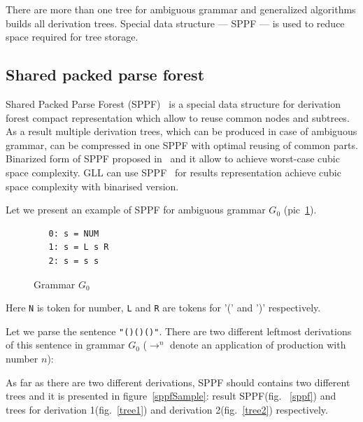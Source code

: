 There are more than one tree for ambiguous grammar and generalized algorithms builds all derivation trees. Special data structure --- SPPF --- is used to reduce space required for tree storage.


\subsection{Shared packed parse forest}

Shared Packed Parse Forest (SPPF)~\cite{SPPF} is a special data structure for derivation forest compact representation which allow to reuse common nodes and subtrees.
As a result multiple derivation trees, which can be produced in case of ambiguous grammar, can be compressed in one SPPF with optimal reusing of common parts.  
Binarized form of SPPF proposed in~\cite{brnglr} and it allow to achieve worst-case cubic space complexity.
GLL can use SPPF~\cite{gllParsingTree} for results representation achieve cubic space complexity with binarised version.

Let we present an example of SPPF for ambiguous grammar $G_0$ (pic~\ref{grammarG0}).

\begin{figure}[h]
   \begin{center}
\begin{verbatim}
   0: s = NUM
   1: s = L s R
   2: s = s s
\end{verbatim}
   \caption{Grammar $G_0$}
   \label{grammarG0}        
   \end{center}
\end{figure}

Here \verb|N| is token for number, \verb|L| and \verb|R| are tokens for '(' and ')'  respectively.

Let we parse the sentence \verb|"()()()"|. 
There are two different leftmost derivations of this sentence in grammar $G_0$ ($\rightarrow ^ n$ denote an application of production with number $n$): 
 
    As far as there are two different derivations, SPPF should contains two different trees and it is presented in figure~\ref{sppfSample}: result SPPF(fig. ~\ref{sppf}) and trees for derivation 1(fig.~\ref{tree1}) and derivation 2(fig.~\ref{tree2}) respectively. 
 
